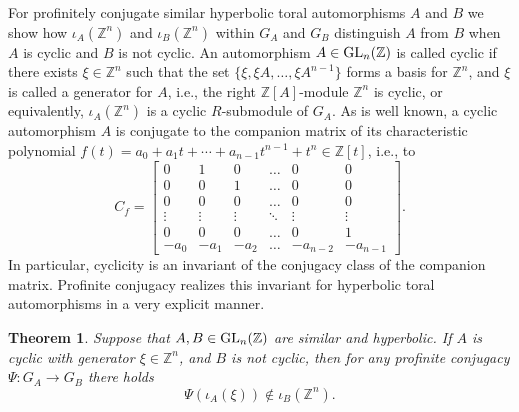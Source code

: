 \documentclass{amsart}
\theoremstyle{plain}
\newtheorem{theorem}{Theorem}[section]
\theoremstyle{definition}
\theoremstyle{remark}
\begin{document}
For profinitely conjugate similar hyperbolic toral automorphisms $A$ and $B$ we show how $\iota_A({\mathbb Z}^n)$ and $\iota_B({\mathbb Z}^n)$ within $G_A$ and $G_B$ distinguish $A$ from $B$ when $A$ is cyclic and $B$ is not cyclic. An automorphism $A\in {\rm GL}_n({\mathbb Z})$ is called cyclic if there exists $\xi\in {\mathbb Z}^n$ such that the set $\{ \xi, \xi A,\dots, \xi A^{n-1}\}$ forms a basis for ${\mathbb Z}^n$, and $\xi$ is called a generator for $A$, i.e., the right ${\mathbb Z}[A]$-module ${\mathbb Z}^n$ is cyclic, or equivalently, $\iota_A({\mathbb Z}^n)$ is a cyclic $R$-submodule of $G_A$. As is well known, a cyclic automorphism $A$ is conjugate to the companion matrix of its characteristic polynomial $f(t) = a_0 + a_1t + \cdots + a_{n-1} t^{n-1} + t^n \in {\mathbb Z}[t]$, i.e., to
\[ C_f=\begin{bmatrix} 
0         &        1 &         0 &  \dots  & 0         & 0      \\
0         &        0 &         1 &  \dots  & 0         & 0      \\
0         &        0 &         0 &  \dots  & 0          & 0      \\
\vdots & \vdots & \vdots & \ddots & \vdots  & \vdots     \\
0         &        0 &        0  &  \dots  & 0          & 1 \\
-a_0    &   -a_1 &  -a_2  &  \dots  &-a_{n-2} & -a_{n-1} 
\end{bmatrix}.\]
In particular, cyclicity is an invariant of the conjugacy class of the companion matrix. Profinite conjugacy realizes this invariant for hyperbolic toral automorphisms in a very explicit manner.

\begin{theorem}\label{cyclicity} Suppose that $A,B\in {\rm GL}_n({\mathbb Z})$ are similar and hyperbolic. If $A$ is cyclic with generator $\xi\in{\mathbb Z}^n$, and $B$ is not cyclic, then for any profinite conjugacy $\Psi:G_A\to G_B$ there holds 
\[ \Psi(\iota_A(\xi))\not\in \iota_B({\mathbb Z}^n).\]
\end{theorem}
\end{document}
